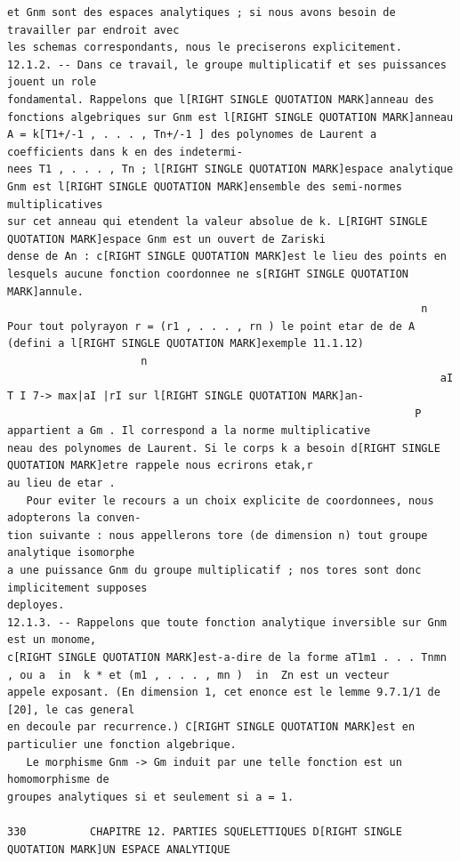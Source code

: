 \documentclass[
  11pt,
]{article}
\begin{document}
\begin{lstlisting}
et Gnm sont des espaces analytiques ; si nous avons besoin de travailler par endroit avec
les schemas correspondants, nous le preciserons explicitement.
12.1.2. -- Dans ce travail, le groupe multiplicatif et ses puissances jouent un role
fondamental. Rappelons que l[RIGHT SINGLE QUOTATION MARK]anneau des fonctions algebriques sur Gnm est l[RIGHT SINGLE QUOTATION MARK]anneau
A = k[T1+/-1 , . . . , Tn+/-1 ] des polynomes de Laurent a coefficients dans k en des indetermi-
nees T1 , . . . , Tn ; l[RIGHT SINGLE QUOTATION MARK]espace analytique Gnm est l[RIGHT SINGLE QUOTATION MARK]ensemble des semi-normes multiplicatives
sur cet anneau qui etendent la valeur absolue de k. L[RIGHT SINGLE QUOTATION MARK]espace Gnm est un ouvert de Zariski
dense de An : c[RIGHT SINGLE QUOTATION MARK]est le lieu des points en lesquels aucune fonction coordonnee ne s[RIGHT SINGLE QUOTATION MARK]annule.
                                                                 n
Pour tout polyrayon r = (r1 , . . . , rn ) le point etar de de A     (defini a l[RIGHT SINGLE QUOTATION MARK]exemple 11.1.12)
                     n
                                                                    aI T I 7-> max|aI |rI sur l[RIGHT SINGLE QUOTATION MARK]an-
                                                                P
appartient a Gm . Il correspond a la norme multiplicative
neau des polynomes de Laurent. Si le corps k a besoin d[RIGHT SINGLE QUOTATION MARK]etre rappele nous ecrirons etak,r
au lieu de etar .
   Pour eviter le recours a un choix explicite de coordonnees, nous adopterons la conven-
tion suivante : nous appellerons tore (de dimension n) tout groupe analytique isomorphe
a une puissance Gnm du groupe multiplicatif ; nos tores sont donc implicitement supposes
deployes.
12.1.3. -- Rappelons que toute fonction analytique inversible sur Gnm est un monome,
c[RIGHT SINGLE QUOTATION MARK]est-a-dire de la forme aT1m1 . . . Tnmn , ou a  in  k * et (m1 , . . . , mn )  in  Zn est un vecteur
appele exposant. (En dimension 1, cet enonce est le lemme 9.7.1/1 de [20], le cas general
en decoule par recurrence.) C[RIGHT SINGLE QUOTATION MARK]est en particulier une fonction algebrique.
   Le morphisme Gnm -> Gm induit par une telle fonction est un homomorphisme de
groupes analytiques si et seulement si a = 1.

330          CHAPITRE 12. PARTIES SQUELETTIQUES D[RIGHT SINGLE QUOTATION MARK]UN ESPACE ANALYTIQUE


\end{lstlisting}
\end{document}
